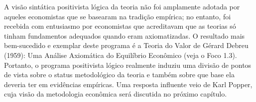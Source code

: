 \documentclass[12pt]{article}
\begin{document}
A visão sintática positivista lógica da teoria não foi amplamente adotada por aqueles economistas que se basearam na tradição empírica; no entanto, foi recebida com entusiasmo por economistas que acreditavam que as teorias só tinham fundamentos adequados quando eram axiomatizadas. O resultado mais bem-sucedido e exemplar deste programa é a Teoria do Valor de Gérard Debreu (1959): Uma Análise Axiomática do Equilíbrio Econômico (veja o Foco 1.3). Portanto, o programa positivista lógico realmente induziu uma divisão de pontos de vista sobre o status metodológico da teoria e também sobre que base ela deveria ter em evidências empíricas. Uma resposta influente veio de Karl Popper, cuja visão da metodologia econômica será discutida no próximo capítulo.
\end{document}
